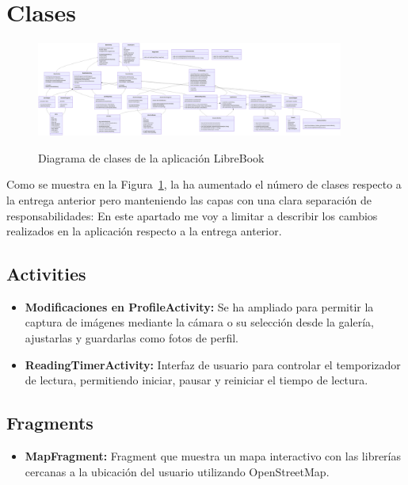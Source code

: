 \documentclass[a4paper,11pt]{report}
\begin{document}
    \section{Clases}
      \begin{figure}[H]
        \centering
        \href{https://raw.githubusercontent.com/Xabierland/DAS-Proyecto/refs/heads/main/Documentation/Memoria2/.img/diagrama-clases.svg}{%
          \includegraphics[width=0.9\textwidth]{.img/diagrama-clases.png}
        }
        \caption{Diagrama de clases de la aplicación LibreBook}
        \label{fig:diagrama-clases}
      \end{figure}
      Como se muestra en la Figura~\ref{fig:diagrama-clases}, la ha aumentado el número de clases respecto a la entrega anterior pero manteniendo las capas con una clara separación de responsabilidades\cite{android_architecture}:
      En este apartado me voy a limitar a describir los cambios realizados en la aplicación respecto a la entrega anterior.
      \subsection{Activities}
        \begin{itemize}
          \item \textbf{Modificaciones en ProfileActivity:} Se ha ampliado para permitir la captura de imágenes mediante la cámara o su selección desde la galería, ajustarlas y guardarlas como fotos de perfil.
          \item \textbf{ReadingTimerActivity:} Interfaz de usuario para controlar el temporizador de lectura, permitiendo iniciar, pausar y reiniciar el tiempo de lectura.
        \end{itemize}
      \subsection{Fragments}
        \begin{itemize}
          \item \textbf{MapFragment:} Fragment que muestra un mapa interactivo con las librerías cercanas a la ubicación del usuario utilizando OpenStreetMap.
        \end{itemize}
\end{document}
